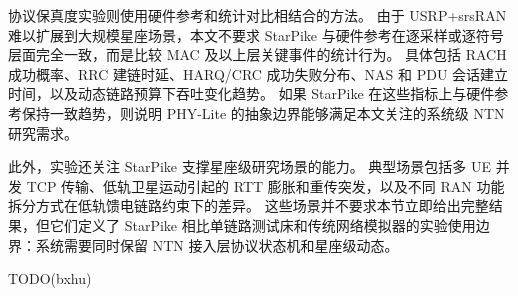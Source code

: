 协议保真度实验则使用硬件参考和统计对比相结合的方法。
由于 USRP+srsRAN 难以扩展到大规模星座场景，本文不要求 StarPike 与硬件参考在逐采样或逐符号层面完全一致，而是比较 MAC 及以上层关键事件的统计行为。
具体包括 RACH 成功概率、RRC 建链时延、HARQ/CRC 成功失败分布、NAS 和 PDU 会话建立时间，以及动态链路预算下吞吐变化趋势。
如果 StarPike 在这些指标上与硬件参考保持一致趋势，则说明 PHY-Lite 的抽象边界能够满足本文关注的系统级 NTN 研究需求。

此外，实验还关注 StarPike 支撑星座级研究场景的能力。
典型场景包括多 UE 并发 TCP 传输、低轨卫星运动引起的 RTT 膨胀和重传突发，以及不同 RAN 功能拆分方式在低轨馈电链路约束下的差异。
这些场景并不要求本节立即给出完整结果，但它们定义了 StarPike 相比单链路测试床和传统网络模拟器的实验使用边界：系统需要同时保留 NTN 接入层协议状态机和星座级动态。


TODO(bxhu)
